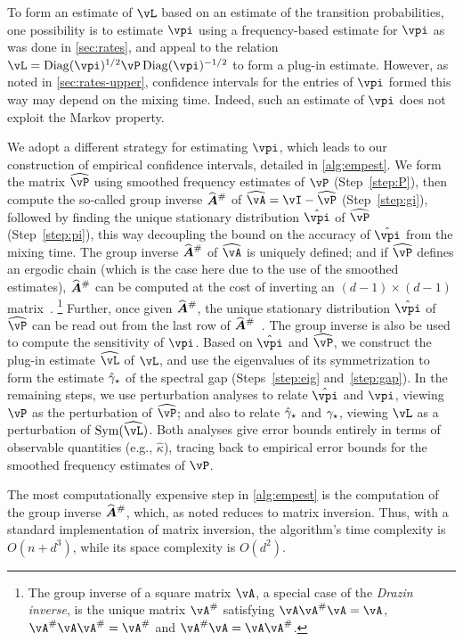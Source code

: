 To form an estimate of $\vL$ based on an estimate of the transition
probabilities, one possibility is to estimate $\vpi$ using a
frequency-based estimate for $\vpi$ as was done in \cref{sec:rates},
and appeal to the relation $\vL = \Diag(\vpi)^{1/2} \vP
\Diag(\vpi)^{-1/2}$ to form a plug-in estimate.
However, as noted in \cref{sec:rates-upper}, confidence intervals for
the entries of $\vpi$ formed this way may depend on the mixing time.
Indeed, such an estimate of $\vpi$ does not exploit the Markov
property.

We adopt a different strategy for estimating $\vpi$, which leads to
our construction of empirical confidence intervals, detailed in
\cref{alg:empest}.
We form the matrix $\wh\vP$ using smoothed frequency estimates of
$\vP$ (Step~\ref{step:P}), then compute the so-called group inverse
$\giAh$ of $\wh\vA = \vI - \wh\vP$ (Step~\ref{step:gi}), followed by
finding the unique stationary distribution $\hat\vpi$ of $\wh\vP$
(Step~\ref{step:pi}), this way decoupling the bound on the accuracy of $\hat\vpi$
from the mixing time.
The group inverse $\giAh$ of $\wh\vA$ is uniquely defined;
 and if
$\wh\vP$ defines an ergodic chain (which is the case here due to the
use of the smoothed estimates), $\giAh$ can be computed at the cost of
inverting an $(d{-}1){\times}(d{-}1)$ matrix~\citep[Theorem
5.2]{meyer1975role}.%
\footnote{%
\label{ftnote:group-inverse}
The group inverse of a square matrix $\vA$, a special case of the {\em Drazin inverse},
is the unique matrix $\vA^\#$ satisfying
$ \vA\vA^\#\vA = \vA$,
$\vA^\#\vA\vA^\# = \vA^\#$ and
$\vA^\#\vA = \vA\vA^\#$.
}
Further, once given $\giAh$, the unique stationary distribution
$\hat\vpi$ of $\wh\vP$ can be read out from the last row of
$\giAh$~\citep[Theorem 5.3]{meyer1975role}.
The group inverse is also be used to compute the sensitivity of
$\vpi$.
Based on $\hat\vpi$ and $\wh\vP$, we construct the plug-in estimate
$\wh\vL$ of $\vL$, and use the eigenvalues of its symmetrization to
form the estimate $\hat\gamma_{\star}$ of the spectral gap (Steps~\ref{step:eig}
and~\ref{step:gap}).
In the remaining steps, 
we use perturbation analyses to relate $\hat\vpi$ and $\vpi$, viewing
$\vP$ as the perturbation of $\wh\vP$; and also to relate $\hat\gamma_{\star}$
and $\gamma_{\star}$, viewing $\vL$ as a perturbation of $\Sym(\wh\vL)$.
Both analyses give error bounds entirely in terms of observable
quantities (e.g., $\hat\kappa$), tracing back to empirical error
bounds for the smoothed frequency estimates of $\vP$.

The most computationally expensive step in \cref{alg:empest} is the
computation of the group inverse $\giAh$, which, as noted reduces to
matrix inversion.
Thus, with a standard implementation of matrix inversion, the
algorithm's time complexity is $O(n + d^3)$, while its space
complexity is $O(d^2)$.

